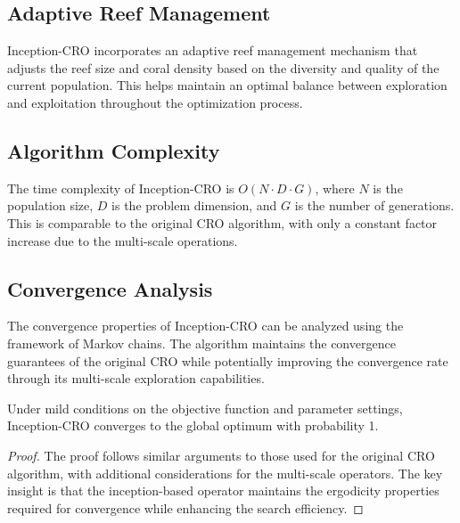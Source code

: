 \subsection{Adaptive Reef Management}

Inception-CRO incorporates an adaptive reef management mechanism that adjusts the reef size and coral density based on the diversity and quality of the current population. This helps maintain an optimal balance between exploration and exploitation throughout the optimization process.

\subsection{Algorithm Complexity}

The time complexity of Inception-CRO is $O(N \cdot D \cdot G)$, where $N$ is the population size, $D$ is the problem dimension, and $G$ is the number of generations. This is comparable to the original CRO algorithm, with only a constant factor increase due to the multi-scale operations.

\subsection{Convergence Analysis}

The convergence properties of Inception-CRO can be analyzed using the framework of Markov chains. The algorithm maintains the convergence guarantees of the original CRO while potentially improving the convergence rate through its multi-scale exploration capabilities.

\begin{theorem}
Under mild conditions on the objective function and parameter settings, Inception-CRO converges to the global optimum with probability 1.
\end{theorem}

\begin{proof}
The proof follows similar arguments to those used for the original CRO algorithm, with additional considerations for the multi-scale operators. The key insight is that the inception-based operator maintains the ergodicity properties required for convergence while enhancing the search efficiency.
\end{proof}
